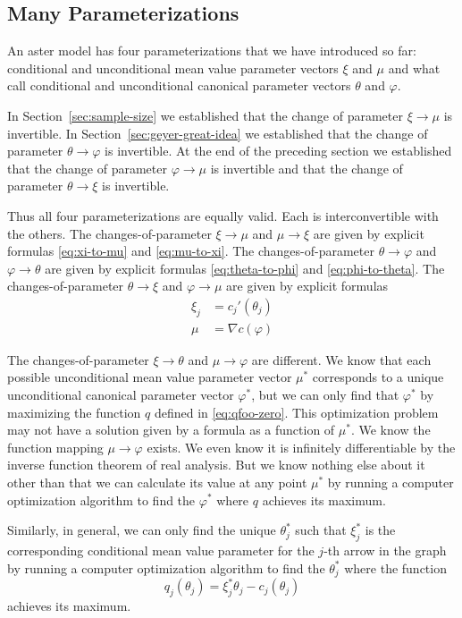 \documentclass[11pt]{article}
\begin{document}
\subsection{Many Parameterizations}

An aster model has four parameterizations that we have introduced so far:
conditional and unconditional mean value parameter vectors $\xi$ and $\mu$
and what \citet{gws} call conditional and unconditional canonical parameter
vectors $\theta$ and $\varphi$.

In Section~\ref{sec:sample-size} we established that the change of parameter
$\xi \to \mu$ is invertible.
In Section~\ref{sec:geyer-great-idea} we established that
the change of parameter $\theta \to \varphi$ is invertible.
At the end of the preceding section we established that
the change of parameter $\varphi \to \mu$ is invertible
and that the change of parameter $\theta \to \xi$ is invertible.

Thus all four parameterizations are
equally valid.  Each is interconvertible with the others.
The changes-of-parameter $\xi \to \mu$ and $\mu \to \xi$ are given by
explicit formulas \eqref{eq:xi-to-mu} and \eqref{eq:mu-to-xi}.
The changes-of-parameter $\theta \to \varphi$ and $\varphi \to \theta$
are given by
explicit formulas \eqref{eq:theta-to-phi} and \eqref{eq:phi-to-theta}.
The changes-of-parameter $\theta \to \xi$ and $\varphi \to \mu$
are given by explicit formulas
\begin{align*}
   \xi_j & = c_j'(\theta_j)
   \\
   \mu & = \nabla c(\varphi)
\end{align*}

The changes-of-parameter $\xi \to \theta$ and $\mu \to \varphi$ are different.
We know that each possible unconditional mean value parameter vector $\mu^*$
corresponds to a unique unconditional canonical parameter vector $\varphi^*$,
but we can only find that $\varphi^*$ by maximizing the function $q$ defined
in \eqref{eq:qfoo-zero}.  This optimization problem may not have a solution
given by a formula as a function of $\mu^*$.  We know the function mapping
$\mu \to \varphi$ exists.  We even know it is infinitely differentiable by
the inverse function theorem of real analysis.  But we know nothing else about
it other than that we can calculate its value at any point $\mu^*$ by running
a computer optimization algorithm to find the $\varphi^*$ where $q$ achieves
its maximum.

Similarly, in general, we can only find the unique $\theta_j^*$
such that $\xi_j^*$ is the corresponding conditional mean value parameter for
the $j$-th arrow in the graph by running a computer optimization algorithm
to find the $\theta_j^*$ where the function
$$
   q_j(\theta_j) = \xi_j^* \theta_j - c_j(\theta_j)
$$
achieves its maximum.
\end{document}
